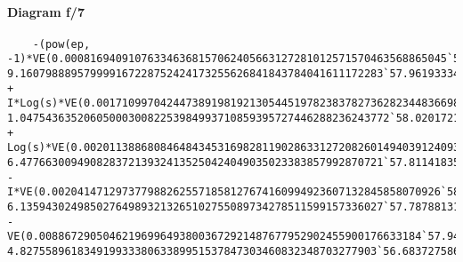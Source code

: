 \documentclass{article}
\begin{document}
\paragraph{Diagram f/7}
\begin{verbatim}
	-(pow(ep, -1)*VE(0.000816940910763346368157062405663127281012571570463568865045`56.91219064520138, 9.160798889579999167228752424173255626841843784041611172283`57.961933349018004*^-45)) + I*Log(s)*VE(0.0017109970424473891981921305445197823837827362823448366985874`58.23324925883983, 1.0475436352060500030082253984993710859395727446288236243772`58.02017212245887*^-44) + Log(s)*VE(0.00201138868084648434531698281190286331272082601494039124093`56.30349600179324, 6.477663009490828372139324135250424049035023383857992870721`57.81141835075576*^-45) - I*VE(0.0020414712973779882625571858127674160994923607132845858070926`58.30994327822033, 6.135943024985027649893213265102755089734278511599157336027`57.787881318338336*^-10) - VE(0.008867290504621969964938003672921487677952902455900176633184`57.94779093678183, 4.82755896183491993338063389951537847303460832348703277903`56.68372758677938*^-10)
\end{verbatim}
\end{document}
